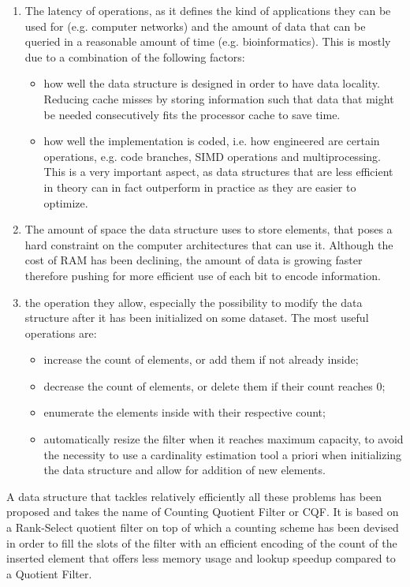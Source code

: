 \begin{enumerate}
	\item The latency of \memb operations, as it defines the kind of applications they can be used for (e.g. computer networks) and the amount of data that can be queried in a reasonable amount of time (e.g. bioinformatics). This is mostly due to a combination of the following factors:
	\begin{itemize}
		\item how well the data structure is designed in order to have data locality. Reducing cache misses by storing information such that data that might be needed consecutively fits the processor cache to save time.
		\item how well the implementation is coded, i.e. how engineered are certain operations, e.g. code branches, SIMD operations and multiprocessing. This is a very important aspect, as data structures that are less efficient in theory can in fact outperform in practice as they are easier to optimize.
	\end{itemize}
	\item The amount of space the data structure uses to store elements, that poses a hard constraint on the computer architectures that can use it. Although the cost of RAM has been declining, the amount of data is growing faster therefore pushing for more efficient use of each bit to encode information.
	\item the operation they allow, especially the possibility to modify the data structure after it has been initialized on some dataset. The most useful operations are:
	\begin{itemize}
		\item increase the count of elements, or add them if not already inside; 
		\item decrease the count of elements, or delete them if their count reaches 0;
		\item enumerate the elements inside with their respective count;
		\item automatically resize the filter when it reaches maximum capacity, to avoid the necessity to use a cardinality estimation tool a priori when initializing the data structure and allow for addition of new elements.
	\end{itemize}
\end{enumerate}
A data structure that tackles relatively efficiently all these problems has been proposed and takes the name of Counting Quotient Filter or CQF. It is based on a Rank-Select quotient filter on top of which a counting scheme has been devised in order to fill the slots of the filter with an efficient encoding of the count of the inserted element that offers less memory usage and lookup speedup compared to a Quotient Filter.

